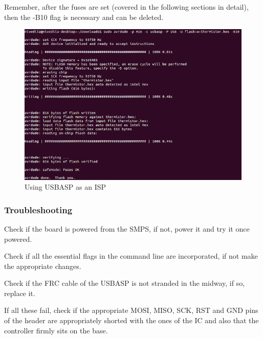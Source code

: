 \documentclass[12pt]{article}
\begin{document}
\vspace{12pt}

Remember, after the fuses are set (covered in the following sections in detail), then the -B10 flag is necessary and can be deleted. 

\vspace{24pt}
\begin{figure}[h!]
\includegraphics[scale=0.9]{usb.png}
\caption{Using USBASP as an ISP }
\end{figure}
\newpage
\subsubsection{Troubleshooting}
\hspace{12pt}\checkmark Check if the board is powered from the SMPS, if not, power it and try it once powered.

\vspace{12pt}

\checkmark Check if all the essential flags in the command line are incorporated, if not make the appropriate changes.

\vspace{12pt}

\checkmark Check if the FRC cable of the USBASP is not stranded in the midway, if so, replace it.

\vspace{12pt}

\checkmark If all these fail, check if the appropriate MOSI, MISO, SCK, RST and GND pins of the header are appropriately shorted with the ones of the IC and also that the controller firmly sits on the base.

\vspace{12pt}
\newpage
\end{document}
